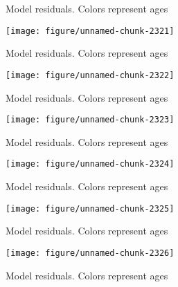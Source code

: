 \documentclass[a4paper]{article}\usepackage{graphicx, color}
\makeatletter
\def\maxwidth{ %
  \ifdim\Gin@nat@width>\linewidth
    \linewidth
  \else
    \Gin@nat@width
  \fi
}
\newenvironment{knitrout}{}{} %
\makeatother
\begin{document}
\begin{knitrout}
\begin{figure}[H]
\caption[Model residuals]{Model residuals. Colors represent ages\label{fig:unnamed-chunk-2320}}
\end{figure}
\begin{figure}[H]


{\centering \texttt{[image: figure/unnamed-chunk-2321]} 

}

\caption[Model residuals]{Model residuals. Colors represent ages\label{fig:unnamed-chunk-2321}}
\end{figure}
\begin{figure}[H]


{\centering \texttt{[image: figure/unnamed-chunk-2322]} 

}

\caption[Model residuals]{Model residuals. Colors represent ages\label{fig:unnamed-chunk-2322}}
\end{figure}
\begin{figure}[H]


{\centering \texttt{[image: figure/unnamed-chunk-2323]} 

}

\caption[Model residuals]{Model residuals. Colors represent ages\label{fig:unnamed-chunk-2323}}
\end{figure}
\begin{figure}[H]


{\centering \texttt{[image: figure/unnamed-chunk-2324]} 

}

\caption[Model residuals]{Model residuals. Colors represent ages\label{fig:unnamed-chunk-2324}}
\end{figure}
\begin{figure}[H]


{\centering \texttt{[image: figure/unnamed-chunk-2325]} 

}

\caption[Model residuals]{Model residuals. Colors represent ages\label{fig:unnamed-chunk-2325}}
\end{figure}
\begin{figure}[H]


{\centering \texttt{[image: figure/unnamed-chunk-2326]} 

}

\caption[Model residuals]{Model residuals. Colors represent ages\label{fig:unnamed-chunk-2326}}
\end{figure}
\begin{figure}[H]



\end{figure}
\end{knitrout}
\end{document}
